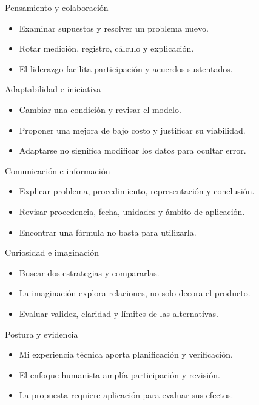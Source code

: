 \documentclass[
	spanish,
	aspectratio=1610,
	xcolor={dvipsnames,table}
]{beamer}
\begin{document}
\begin{frame}{Pensamiento y colaboración}
\fontsize{14}{18}\selectfont\begin{itemize}\setlength{\itemsep}{.45cm}
\item Examinar supuestos y resolver un problema nuevo.
\item Rotar medición, registro, cálculo y explicación.
\item El liderazgo facilita participación y acuerdos sustentados.
\end{itemize}
\end{frame}
\begin{frame}{Adaptabilidad e iniciativa}
\fontsize{14}{18}\selectfont\begin{itemize}\setlength{\itemsep}{.45cm}
\item Cambiar una condición y revisar el modelo.
\item Proponer una mejora de bajo costo y justificar su viabilidad.
\item Adaptarse no significa modificar los datos para ocultar error.
\end{itemize}
\end{frame}
\begin{frame}{Comunicación e información}
\fontsize{14}{18}\selectfont\begin{itemize}\setlength{\itemsep}{.45cm}
\item Explicar problema, procedimiento, representación y conclusión.
\item Revisar procedencia, fecha, unidades y ámbito de aplicación.
\item Encontrar una fórmula no basta para utilizarla.
\end{itemize}
\end{frame}
\begin{frame}{Curiosidad e imaginación}
\fontsize{14}{18}\selectfont\begin{itemize}\setlength{\itemsep}{.45cm}
\item Buscar dos estrategias y compararlas.
\item La imaginación explora relaciones, no solo decora el producto.
\item Evaluar validez, claridad y límites de las alternativas.
\end{itemize}
\end{frame}
\begin{frame}{Postura y evidencia}
\fontsize{14}{18}\selectfont\begin{itemize}\setlength{\itemsep}{.45cm}
\item Mi experiencia técnica aporta planificación y verificación.
\item El enfoque humanista amplía participación y revisión.
\item La propuesta requiere aplicación para evaluar sus efectos.
\end{itemize}
\end{frame}
\end{document}
